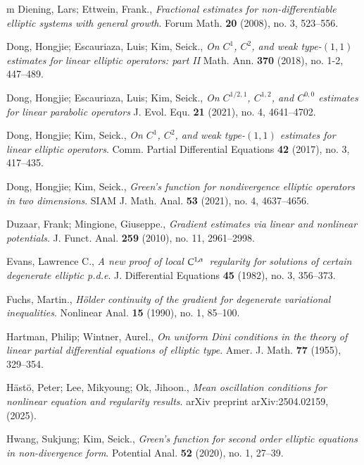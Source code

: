 \documentclass[reqno]{amsart}
\numberwithin{equation}{section}
\theoremstyle{plain}
\theoremstyle{definition}
\theoremstyle{remark}
\begin{document}
\begin{thebibliography}{m}
%
Diening, Lars; Ettwein, Frank.,
{\it Fractional estimates for non-differentiable elliptic systems with general growth}. 
Forum Math. {\bf 20} (2008), no. 3, 523--556.


%
Dong, Hongjie; Escauriaza, Luis; Kim, Seick.,
{\it On {$C^1$}, {$C^2$}, and weak type-{$(1,1)$} estimates for linear elliptic operators: part {II}}
Math. Ann. {\bf 370} (2018), no. 1-2, 447--489.


%
Dong, Hongjie; Escauriaza, Luis; Kim, Seick.,
{\it On {$C^{1/2,1}$}, {$C^{1,2}$}, and {$C^{0,0}$} estimates for linear parabolic operators}
J. Evol. Equ. {\bf 21} (2021), no. 4, 4641--4702.

%
Dong, Hongjie; Kim, Seick.,
{\it On {$C^1$}, {$C^2$}, and weak type-{$(1,1)$} estimates for linear elliptic operators}. 
Comm. Partial Differential Equations {\bf 42} (2017), no. 3, 417--435.


%
Dong, Hongjie; Kim, Seick.,
{\it Green's function for nondivergence elliptic operators in two dimensions}. 
SIAM J. Math. Anal. {\bf 53} (2021), no. 4, 4637--4656.


%
Duzaar, Frank; Mingione, Giuseppe.,
{\it Gradient estimates via linear and nonlinear potentials}.
J. Funct. Anal. {\bf 259} (2010), no. 11, 2961--2998.


%
Evans, Lawrence C.,
{\it A new proof of local {$C\sp{1,\alpha }$}\ regularity for solutions of certain degenerate elliptic p.d.e}. 
J. Differential Equations {\bf 45} (1982), no. 3, 356--373.



%
Fuchs, Martin.,
{\it Hölder continuity of the gradient for degenerate variational inequalities}.
Nonlinear Anal. {\bf 15} (1990), no. 1, 85--100.

%
Hartman, Philip; Wintner, Aurel.,
{\it  On uniform Dini conditions in the theory of linear partial differential equations of elliptic type}.
Amer. J. Math. {\bf 77} (1955), 329--354.

% 
H\"{a}st\"{o}, Peter; Lee, Mikyoung; Ok, Jihoon.,
{\it Mean oscillation conditions for nonlinear equation and regularity results}. 
arXiv preprint arXiv:2504.02159, (2025).

%
Hwang, Sukjung; Kim, Seick.,
{\it Green's function for second order elliptic equations in non-divergence form}.
Potential Anal. {\bf 52} (2020), no. 1, 27--39.


\end{thebibliography}
\end{document}
